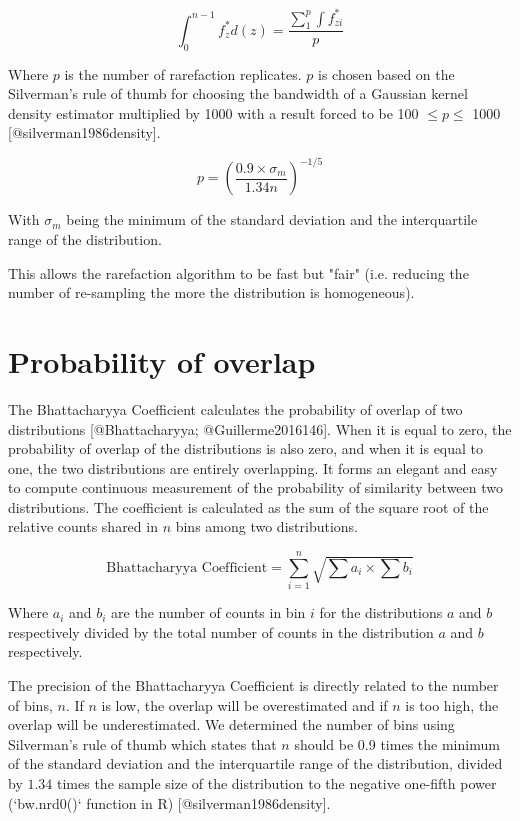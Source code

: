 \documentclass[a4paper,11pt]{article}
\begin{document}
\begin{equation}
    \int_{0}^{n-1}f^*_{z}d(z) = \frac{\sum_1^p\int f^*_{zi}}{p}
\end{equation}


Where $p$ is the number of rarefaction replicates.
$p$ is chosen based on the Silverman's rule of thumb for choosing the bandwidth of a Gaussian kernel density estimator multiplied by 1000 with a result forced to be 100 $\leq p \leq$ 1000 [@silverman1986density].

\begin{equation}
    p=\left(\frac{0.9\times \sigma_{m} }{1.34n}\right)^{-1/5}
\end{equation}

With $\sigma_{m}$ being the minimum of the standard deviation and the interquartile range of the distribution.

This allows the rarefaction algorithm to be fast but "fair" (i.e. reducing the number of re-sampling the more the distribution is homogeneous).

\section{Probability of overlap}

The Bhattacharyya Coefficient calculates the probability of overlap of two distributions [@Bhattacharyya; @Guillerme2016146].
When it is equal to zero, the probability of overlap of the distributions is also zero, and when it is equal to one, the two distributions are entirely overlapping.
It forms an elegant and easy to compute continuous measurement of the probability of similarity between two distributions.
The coefficient is calculated as the sum of the square root of the relative counts shared in $n$ bins among two distributions.

\begin{equation}
\text{Bhattacharyya Coefficient}=\sum_{i=1}^{n} \sqrt{{\sum{a_i}}\times{\sum{b_i}}}
\end{equation}

Where ${a_i}$ and ${b_i}$  are the number of counts in bin $i$ for the distributions $a$ and $b$ respectively divided by the total number of counts in the distribution $a$ and $b$ respectively.

The precision of the Bhattacharyya Coefficient is directly related to the number of bins, $n$.
If $n$ is low, the overlap will be overestimated and if $n$ is too high, the overlap will be underestimated.
We determined the number of bins using Silverman's rule of thumb which states that $n$ should be 0.9 times the minimum of the standard deviation and the interquartile range of the distribution, divided by $1.34$ times the sample size of the distribution to the negative one-fifth power (`bw.nrd0()` function in R) [@silverman1986density].
\end{document}
